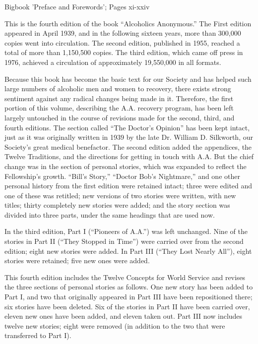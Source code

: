 
Bigbook 'Preface and Forewords'; Pages xi-xxiv

\begin{biblechapter}
 This is the fourth edition of the book “Alcoholics Anonymous.”
\verse The First edition appeared in April 1939, 
    and in the following sixteen years, 
    more than 300,000 copies went into circulation.
\verse The second edition, published in 1955, 
    reached a total of more than 1,150,500 copies.
\verse The third edition, which came off press in 1976, 
    achieved a circulation of approximately 19,550,000 in all formats.

\verse Because this book has become the basic text for our Society 
    and has helped such large numbers of alcoholic men and women to recovery, 
    there exists strong sentiment against any radical changes being made in it.
\verse Therefore, the first portion of this volume, 
    describing the A.A. recovery program, 
    has been left largely untouched in the course of revisions 
    made for the second, third, and fourth editions.
\verse The section called “The Doctor’s Opinion” has been kept intact, 
    just as it was originally written in 1939 by the late Dr. William D. Silkworth, 
    our Society’s great medical benefactor.
\verse The second edition added the appendices, 
    the Twelve Traditions, 
    and the directions for getting in touch with A.A.
\verse But the chief change was in the section of personal stories, 
    which was expanded to reflect the Fellowship’s growth.
\verse “Bill’s Story,” “Doctor Bob’s Nightmare,” 
    and one other personal history from the first edition were retained intact; 
    three were edited and one of these was retitled; 
    new versions of two stories were written, with new titles; 
    thirty completely new stories were added; 
    and the story section was divided into three parts, 
    under the same headings that are used now.

\verse In the third edition, Part I (“Pioneers of A.A.”) was left unchanged.
\verse Nine of the stories in Part II (“They Stopped in Time”) were carried over from the second edition; 
    eight new stories were added.
\verse In Part III (“They Lost Nearly All”), 
    eight stories were retained; five new ones were added. 

\verse This fourth edition includes the Twelve Concepts for World Service and revises the three sections of personal stories as follows.
\verse One new story has been added to Part I, and two that originally appeared in Part III have been repositioned there; 
    six stories have been deleted.
\verse Six of the stories in Part II have been carried over, 
    eleven new ones have been added, 
    and eleven taken out.
\verse Part III now includes twelve new stories; 
    eight were removed (in addition to the two that were transferred to Part I).


\end{biblechapter}
